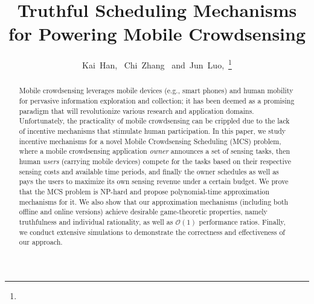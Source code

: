 \documentclass[10pt,journal,compsoc]{IEEEtran}
\begin{document}
\title{Truthful Scheduling Mechanisms for Powering Mobile Crowdsensing}

\author{Kai~Han,~
        Chi~Zhang~
        and~Jun~Luo,~\thanks{}}

\maketitle


\begin{abstract}
Mobile crowdsensing leverages mobile devices (e.g., smart phones) and human mobility for pervasive information exploration and collection; it has been deemed as a promising paradigm that will revolutionize various research and application domains. Unfortunately, the practicality of mobile crowdsensing can be crippled due to the lack of incentive mechanisms that stimulate human participation. In this paper, we study incentive mechanisms for a novel Mobile Crowdsensing Scheduling (MCS) problem, where a mobile crowdsensing application \textit{owner} announces a set of sensing tasks, then human \textit{users} (carrying mobile devices) compete for the tasks based on their respective sensing costs and available time periods, and finally the owner schedules as well as pays the users to maximize its own sensing revenue under a certain budget. We prove that the MCS problem is NP-hard and propose polynomial-time approximation mechanisms for it. We also show that our approximation mechanisms (including both offline and online versions) achieve desirable game-theoretic properties, namely truthfulness and individual rationality, as well as $\mathcal{O}(1)$ performance ratios. Finally, we conduct extensive simulations to demonstrate the correctness and effectiveness of our approach.
\end{abstract}

\IEEEpeerreviewmaketitle
\end{document}

